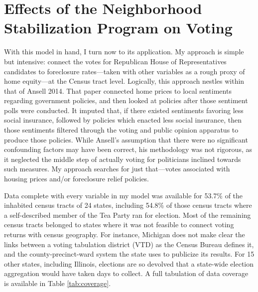 \documentclass[
]{article}
\author{}
\date{\vspace{-2.5em}}
\begin{document}
{
\setcounter{tocdepth}{2}
\tableofcontents
}
\hypertarget{outcome}{%
\section{Effects of the Neighborhood Stabilization Program on Voting}\label{outcome}}

With this model in hand, I turn now to its application.
My approach is simple but intensive: connect the votes for Republican House of Representatives candidates to foreclosure rates---taken with other variables as a rough proxy of home equity---at the Census tract level.
Logically, this approach nestles within that of Ansell 2014.
That paper connected home prices to local sentiments regarding government policies, and then looked at policies after those sentiment polls were conducted.
It imputed that, if there existed sentiments favoring less social insurance, followed by policies which enacted less social insurance, then those sentiments filtered through the voting and public opinion apparatus to produce those policies.
While Ansell's assumption that there were no significant confounding factors may have been correct, his methodology was not rigorous, as it neglected the middle step of actually voting for politicians inclined towards such measures.
My approach searches for just that---votes associated with housing prices and/or foreclosure relief policies.

Data complete with every variable in my model was available for 53.7\% of the inhabited census tracts of 24 states, including 54.8\% of those census tracts where a self-described member of the Tea Party ran for election.
Most of the remaining census tracts belonged to states where it was not feasible to connect voting returns with census geography.
For instance, Michigan does not make clear the links between a voting tabulation district (VTD) as the Census Bureau defines it, and the county-precinct-ward system the state uses to publicize its results.
For 15 other states, including Illinois, elections are so devolved that a state-wide election aggregation would have taken days to collect.
A full tabulation of data coverage is available in Table \ref{tab:coverage}.
\end{document}
